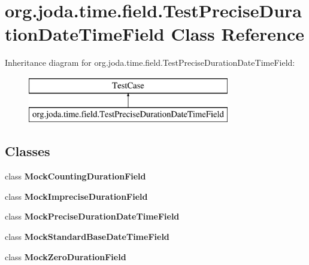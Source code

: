 \hypertarget{classorg_1_1joda_1_1time_1_1field_1_1_test_precise_duration_date_time_field}{\section{org.\-joda.\-time.\-field.\-Test\-Precise\-Duration\-Date\-Time\-Field Class Reference}
\label{classorg_1_1joda_1_1time_1_1field_1_1_test_precise_duration_date_time_field}
}
Inheritance diagram for org.\-joda.\-time.\-field.\-Test\-Precise\-Duration\-Date\-Time\-Field\-:\begin{figure}[H]
\begin{center}
\leavevmode
\includegraphics[height=2.000000cm]{classorg_1_1joda_1_1time_1_1field_1_1_test_precise_duration_date_time_field}
\end{center}
\end{figure}
\subsection*{Classes}
\begin{DoxyCompactItemize}
\item 
class {\bfseries Mock\-Counting\-Duration\-Field}
\item 
class {\bfseries Mock\-Imprecise\-Duration\-Field}
\item 
class {\bfseries Mock\-Precise\-Duration\-Date\-Time\-Field}
\item 
class {\bfseries Mock\-Standard\-Base\-Date\-Time\-Field}
\item 
class {\bfseries Mock\-Zero\-Duration\-Field}
\end{DoxyCompactItemize}

